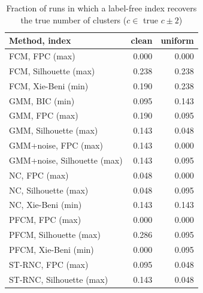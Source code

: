 \begin{table}[t]
\centering
\scriptsize
\setlength{\tabcolsep}{3pt}
\caption{Fraction of runs in which a label-free index recovers the true number of clusters ($c \in$ true $c \pm 2$)}
\label{tab:c-selection}
\begin{tabular}{lrr}
\toprule
Method, index & clean & uniform \\
\midrule
FCM, FPC (max) & 0.000 & 0.000 \\
FCM, Silhouette (max) & 0.238 & 0.238 \\
FCM, Xie-Beni (min) & 0.190 & 0.238 \\
GMM, BIC (min) & 0.095 & 0.143 \\
GMM, FPC (max) & 0.190 & 0.095 \\
GMM, Silhouette (max) & 0.143 & 0.048 \\
GMM+noise, FPC (max) & 0.143 & 0.000 \\
GMM+noise, Silhouette (max) & 0.143 & 0.095 \\
NC, FPC (max) & 0.048 & 0.000 \\
NC, Silhouette (max) & 0.048 & 0.095 \\
NC, Xie-Beni (min) & 0.143 & 0.143 \\
PFCM, FPC (max) & 0.000 & 0.000 \\
PFCM, Silhouette (max) & 0.286 & 0.095 \\
PFCM, Xie-Beni (min) & 0.000 & 0.095 \\
ST-RNC, FPC (max) & 0.095 & 0.048 \\
ST-RNC, Silhouette (max) & 0.143 & 0.048 \\
\bottomrule
\end{tabular}
\end{table}
